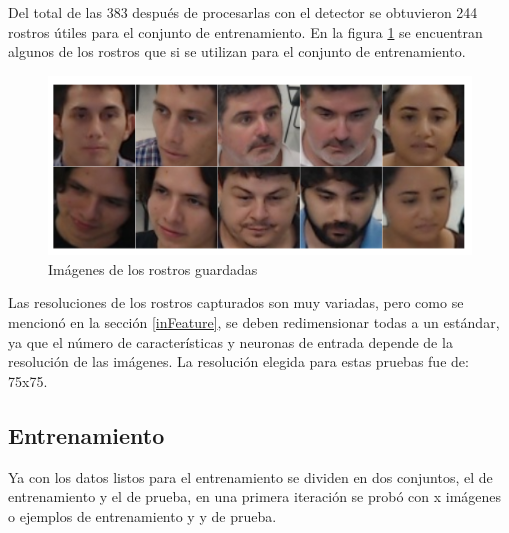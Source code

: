 Del total de las 383 después de procesarlas con el detector se obtuvieron 244 rostros útiles para el conjunto de entrenamiento. En la figura \ref{fig: figFacesLab} se encuentran algunos de los rostros que si se utilizan para el conjunto de entrenamiento.
\begin{figure}[htbp] 
	\centering
	\includegraphics[width=.5\textwidth]{./pictures/facesLab}
	\caption{Imágenes de los rostros guardadas}\label{fig: figFacesLab}
\end{figure}
Las resoluciones de los rostros capturados son muy variadas, pero como se mencionó en la sección \ref{inFeature}, se deben redimensionar todas a un estándar, ya que el número de características y neuronas de entrada depende de la resolución de las imágenes. La resolución elegida para estas pruebas fue de: 75x75.
\subsection{Entrenamiento}
Ya con los datos listos para el entrenamiento se dividen en dos conjuntos, el de entrenamiento y el de prueba, en una primera iteración se probó con x imágenes o ejemplos de entrenamiento y y de prueba. 